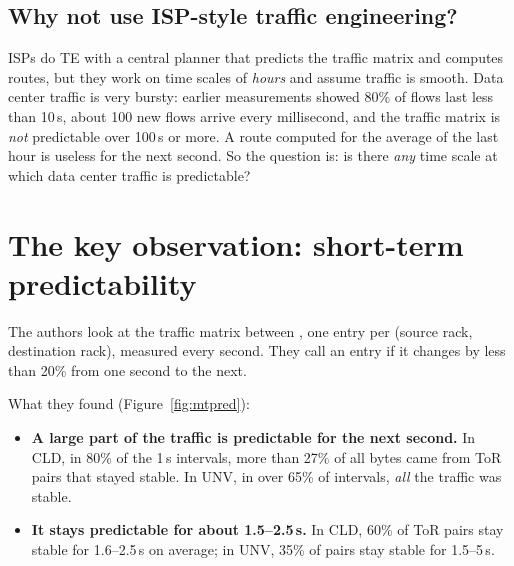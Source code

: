 \subsection{Why not use ISP-style traffic engineering?}
ISPs do TE with a central planner that predicts the traffic matrix and computes routes, but they work on time scales of
\emph{hours} and assume traffic is smooth. Data center traffic is very bursty: earlier measurements showed 80\% of flows last less
than 10\,s, about 100 new flows arrive every millisecond, and the traffic matrix is \emph{not} predictable over 100\,s or more. A
route computed for the average of the last hour is useless for the next second. So the question is: is there \emph{any} time scale at
which data center traffic is predictable?

\section{The key observation: short-term predictability}

The authors look at the traffic matrix between , one entry per (source rack, destination rack),
measured every second. They call an entry  if it changes by less than 20\% from one second to the next.


What they found (Figure~\ref{fig:mtpred}):
\begin{itemize}
  \item \textbf{A large part of the traffic is predictable for the next second.} In CLD, in 80\% of the 1\,s intervals, more than
        27\% of all bytes came from ToR pairs that stayed stable. In UNV, in over 65\% of intervals, \emph{all} the traffic was stable.
  \item \textbf{It stays predictable for about 1.5--2.5\,s.} In CLD, 60\% of ToR pairs stay stable for 1.6--2.5\,s on average; in UNV,
        35\% of pairs stay stable for 1.5--5\,s.
\end{itemize}

